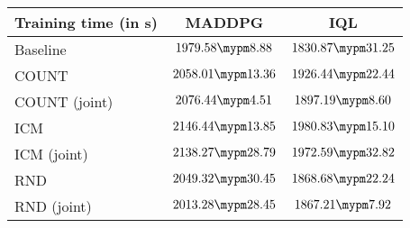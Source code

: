 \begin{tabular}{l | c c}
	Training time (in s) & MADDPG & IQL\\ \toprule
		Baseline & $1979.58 \mypm 8.88$ & $1830.87 \mypm 31.25$ \\ \midrule
	COUNT & $2058.01 \mypm 13.36$ & $1926.44 \mypm 22.44$ \\
	COUNT (joint) & $2076.44 \mypm 4.51$ & $1897.19 \mypm 8.60$ \\\midrule
	ICM & $2146.44 \mypm 13.85$ & $1980.83 \mypm 15.10$ \\
	ICM (joint) & $2138.27 \mypm 28.79$ & $1972.59 \mypm 32.82$ \\\midrule
	RND & $2049.32 \mypm 30.45$ & $1868.68 \mypm 22.24$ \\
	RND (joint) & $2013.28 \mypm 28.45$ & $1867.21 \mypm 7.92$ \\\midrule
\end{tabular}
